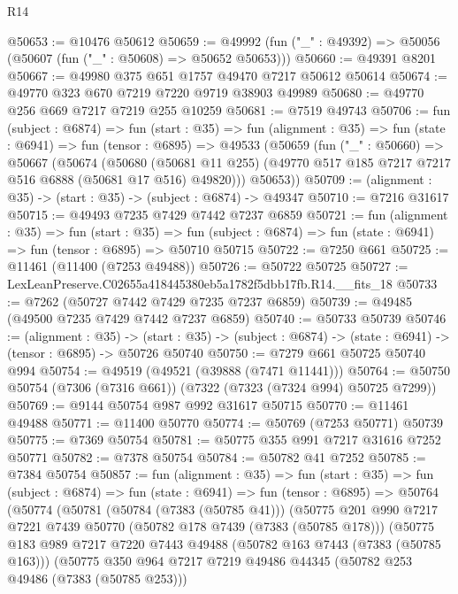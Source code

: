 \begin{lexlean}{R14}
\begin{coremodule}
@50653 := @10476 @50612
@50659 := @49992 (fun ("_" : @49392) => @50056 (@50607 (fun ("_" : @50608) => @50652 @50653)))
@50660 := @49391 @8201
@50667 := @49980 @375 @651 @1757 @49470 @7217 @50612 @50614
@50674 := @49770 @323 @670 @7219 @7220 @9719 @38903 @49989
@50680 := @49770 @256 @669 @7217 @7219 @255 @10259
@50681 := @7519 @49743
@50706 := fun (subject : @6874) =>
  fun (start : @35) =>
  fun (alignment : @35) =>
  fun (state : @6941) =>
  fun (tensor : @6895) =>
  @49533
    (@50659
      (fun ("_" : @50660) =>
      @50667
        (@50674
          (@50680
            (@50681 @11 @255)
            (@49770 @517 @185 @7217 @7217 @516 @6888 (@50681 @17 @516) @49820)))
        @50653))
@50709 := (alignment : @35) -> (start : @35) -> (subject : @6874) -> @49347
@50710 := @7216 @31617
@50715 := @49493 @7235 @7429 @7442 @7237 @6859
@50721 := fun (alignment : @35) =>
  fun (start : @35) =>
  fun (subject : @6874) => fun (state : @6941) => fun (tensor : @6895) => @50710 @50715
@50722 := @7250 @661
@50725 := @11461 (@11400 (@7253 @49488))
@50726 := @50722 @50725
@50727 := LexLeanPreserve.C02655a418445380eb5a1782f5dbb17fb.R14.__fits_18
@50733 := @7262 (@50727 @7442 @7429 @7235 @7237 @6859)
@50739 := @49485 (@49500 @7235 @7429 @7442 @7237 @6859)
@50740 := @50733 @50739
@50746 := (alignment : @35) ->
  (start : @35) -> (subject : @6874) -> (state : @6941) -> (tensor : @6895) -> @50726 @50740
@50750 := @7279 @661 @50725 @50740 @994
@50754 := @49519 (@49521 (@39888 (@7471 @11441)))
@50764 := @50750 @50754 (@7306 (@7316 @661)) (@7322 (@7323 (@7324 @994) @50725 @7299))
@50769 := @9144 @50754 @987 @992 @31617 @50715
@50770 := @11461 @49488
@50771 := @11400 @50770
@50774 := @50769 (@7253 @50771) @50739
@50775 := @7369 @50754
@50781 := @50775 @355 @991 @7217 @31616 @7252 @50771
@50782 := @7378 @50754
@50784 := @50782 @41 @7252
@50785 := @7384 @50754
@50857 := fun (alignment : @35) =>
  fun (start : @35) =>
  fun (subject : @6874) =>
  fun (state : @6941) =>
  fun (tensor : @6895) =>
  @50764
    (@50774
      (@50781
        (@50784 (@7383 (@50785 @41)))
        (@50775
          @201
          @990
          @7217
          @7221
          @7439
          @50770
          (@50782 @178 @7439 (@7383 (@50785 @178)))
          (@50775
            @183
            @989
            @7217
            @7220
            @7443
            @49488
            (@50782 @163 @7443 (@7383 (@50785 @163)))
            (@50775
              @350
              @964
              @7217
              @7219
              @49486
              @44345
              (@50782 @253 @49486 (@7383 (@50785 @253)))

\end{coremodule}
\end{lexlean}
